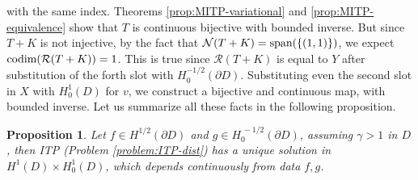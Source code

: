 \documentclass[10pt, a4paper, twoside, openright]{book}
\theoremstyle{definition}
\theoremstyle{plain}
\theoremstyle{plain}
\theoremstyle{plain}
\newtheorem{proposition}[subsection]{Proposition}
\theoremstyle{plain}
\theoremstyle{plain}
\theoremstyle{plain}
\theoremstyle{plain}
\theoremstyle{plain}
\begin{document}
with the same index. Theorems \ref{prop:MITP-variational} and \ref{prop:MITP-equivalence} show 
that $T$ is continuous bijective with bounded inverse. But since $T+K$ is not injective, by the 
fact that $\mathcal{N}(T+K)=\textup{span}(\{(1,1)\})$, we expect 
$\textup{codim}(\mathcal{R}(T+K))=1$. This is true since $\mathcal{R}(T+K)$ is equal to 
$Y$ after substitution of the forth slot with $H^{-1/2}_0(\partial D)$. Substituting even 
the second slot in $X$ with $H^1_0(D)$ for $v$, we construct a bijective and continuous map, with bounded inverse.
Let us summarize all these facts in the following proposition.
\begin{proposition}
 Let $f\in H^{1/2}(\partial D)$ and $g\in H^{\,-1/2}_0(\partial D)$, assuming $\gamma>1$ in $D$, then ITP (Problem \ref{problem:ITP-dist}) has a unique solution in $H^1(D)\times H^1_0(D)$, which depends continuously from data $f,g$.
\end{proposition}
\end{document}
